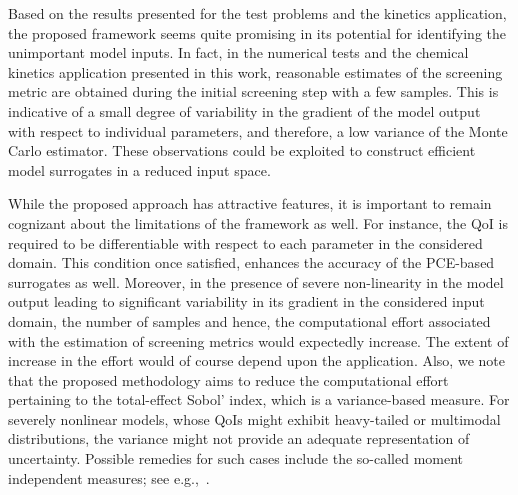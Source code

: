 Based on the results presented for the test problems and the kinetics
application, the proposed framework seems quite promising in its potential for
identifying the unimportant model inputs. In fact, in the numerical
tests and the chemical kinetics application presented in this work, reasonable
estimates of the screening metric are obtained during the initial screening
step with a few samples. This is indicative of a small degree of variability in
the gradient of the model output with respect to individual parameters, and
therefore, a low variance of the Monte Carlo estimator. These observations
could be exploited to construct efficient model surrogates in a reduced input
space. 

While the proposed approach has attractive features, it is important to remain cognizant
about the limitations of the framework as well. 
For instance, the QoI is required to be differentiable with
respect to each parameter in the considered domain. This condition once
satisfied, enhances the accuracy of the PCE-based surrogates as well.  
Moreover, in the presence of severe non-linearity in the model output
leading to significant variability in its gradient in the considered input domain,
the number of samples and hence, the computational effort associated with
the estimation of screening metrics would expectedly 
increase. The extent of increase in the effort would of course depend upon the
application. 
Also, we note that the proposed methodology aims to reduce the computational
effort pertaining to the total-effect Sobol' index, which is a
variance-based measure.  For severely nonlinear models, whose QoIs
might exhibit heavy-tailed or multimodal distributions, the 
variance might not provide an adequate representation of uncertainty.
Possible remedies for such cases include the so-called moment independent
measures; see e.g.,~\cite{BorgonovoIooss16,IoossLemaitre15}.

